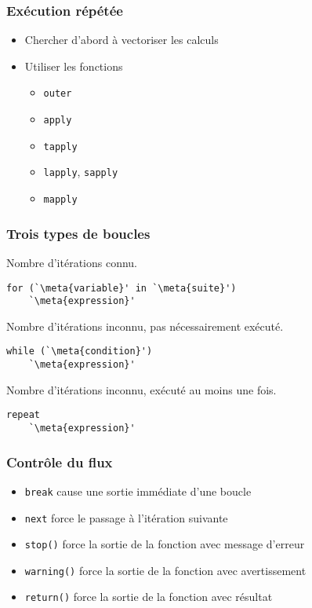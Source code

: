 \begin{frame}
  \frametitle{Exécution répétée}

  \begin{itemize}
  \item Chercher d'abord à vectoriser les calculs
  \item Utiliser les fonctions
    \begin{itemize}
    \item \texttt{outer}
    \item \texttt{apply}
    \item \texttt{tapply}
    \item \texttt{lapply}, \texttt{sapply}
    \item \texttt{mapply}
    \end{itemize}
  \end{itemize}
\end{frame}

\begin{frame}[fragile=singleslide]
  \frametitle{Trois types de boucles}

  Nombre d'itérations connu.
  \begin{Schunk}
\begin{lstlisting}
for (`\meta{variable}' in `\meta{suite}')
    `\meta{expression}'
\end{lstlisting}
  \end{Schunk}

  Nombre d'itérations inconnu, pas nécessairement exécuté.
  \begin{Schunk}
\begin{lstlisting}
while (`\meta{condition}')
    `\meta{expression}'
\end{lstlisting}
  \end{Schunk}

  Nombre d'itérations inconnu, exécuté au moins une fois.
  \begin{Schunk}
\begin{lstlisting}
repeat
    `\meta{expression}'
\end{lstlisting}
  \end{Schunk}
\end{frame}

\begin{frame}
  \frametitle{Contrôle du flux}

  \begin{itemize}
  \item \texttt{break} cause une sortie immédiate d'une boucle
  \item \texttt{next} force le passage à l'itération suivante
  \item \texttt{stop()} force la sortie de la fonction avec message
    d'erreur
  \item \texttt{warning()} force la sortie de la fonction avec
    avertissement
  \item \texttt{return()} force la sortie de la fonction avec résultat
  \end{itemize}

  \pause
\end{frame}

